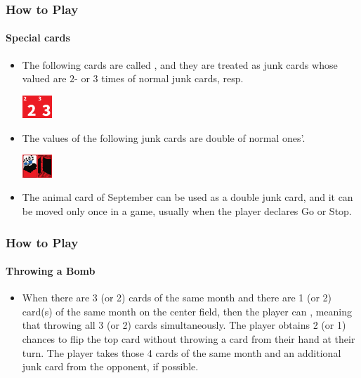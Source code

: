 \begin{frame}[fragile]
  \frametitle{How to Play}
  \framesubtitle{Special cards}

  \begin{itemize}
    \item The following cards are called , and they are treated as junk cards whose valued are $2$- or $3$ times of normal junk cards, resp.
    \begin{center}
      \vspace*{-.5em}
      \includegraphics[width=1.5em]{images/cards/bonus2}\quad \includegraphics[width=1.5em]{images/cards/bonus3}
      \vspace*{.5em}
    \end{center}
    \item The values of the following junk cards are double of normal ones'.
    \begin{center}
      \vspace*{-.5em}
      \includegraphics[width=1.5em]{images/cards/J112}\quad \includegraphics[width=1.5em]{images/cards/J120}
      \vspace*{.5em}
    \end{center}
    \item The animal card of September  can be used as a double junk card, and it can be moved only once in a game, usually when the player declares Go or Stop.
  \end{itemize}
\end{frame}

\begin{frame}[fragile]
  \frametitle{How to Play}
  \framesubtitle{Throwing a Bomb}

  \begin{itemize}
    \item When there are 3 (or 2) cards of the same month and there are 1 (or 2) card(s) of the same month on the center field, then the player can , meaning that throwing all 3 (or 2) cards simultaneously. The player obtains 2 (or 1) chances to flip the top card without throwing a card from their hand at their turn. The player takes those 4 cards of the same month and an additional junk card from the opponent, if possible.
  \end{itemize}
\end{frame}

